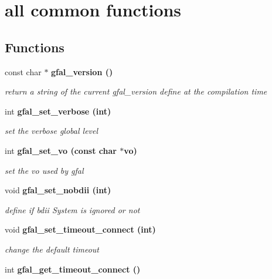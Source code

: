 \section{all common functions}
\label{group__common__group}
\subsection*{Functions}
\begin{CompactItemize}
\item 
const char $\ast$ \bf{gfal\_\-version} ()\label{group__common__group_ga5a8df616e6a5e6fc1d94e2374c7ccf2}

\begin{CompactList}\small\item\em return a string of the current gfal\_\-version define at the compilation time \item\end{CompactList}\item 
int \bf{gfal\_\-set\_\-verbose} (int)
\begin{CompactList}\small\item\em set the verbose global level \item\end{CompactList}\item 
int \bf{gfal\_\-set\_\-vo} (const char $\ast$vo)\label{group__common__group_gcf4ae9045b7e5a2a697b1bb1f05994a8}

\begin{CompactList}\small\item\em set the vo used by gfal \item\end{CompactList}\item 
void \bf{gfal\_\-set\_\-nobdii} (int)
\begin{CompactList}\small\item\em define if bdii System is ignored or not \item\end{CompactList}\item 
void \bf{gfal\_\-set\_\-timeout\_\-connect} (int)\label{group__common__group_g62f544258aa58af5122f40f0eb1a7c92}

\begin{CompactList}\small\item\em change the default timeout \item\end{CompactList}\item 
int \bf{gfal\_\-get\_\-timeout\_\-connect} ()\label{group__common__group_g63ec5d282f39173b678ecad2d60a4a6f}


\end{CompactItemize}
